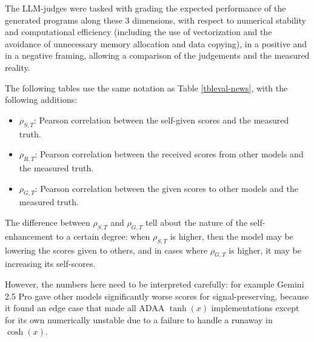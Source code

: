 \documentclass[noindent,nohyp,parspace,titlepage,twoside,12pt]{article}
\begin{document}
    The LLM-judges were tasked with grading the expected performance of the
    generated programs along these 3 dimensions, with respect to numerical
    stability and computational efficiency (including the use of vectorization
    and the avoidance of unnecessary memory allocation and data copying), in
    a positive and in a negative framing, allowing a comparison of the
    judgements and the measured reality.

    The following tables use the same notation as Table \ref{tbleval-news},
    with the following additions:

    \begin{itemize}
      \item $\rho_{S, T}$: Pearson correlation between the self-given scores
            and the measured truth.

      \item $\rho_{R, T}$: Pearson correlation between the received scores
            from other models and the measured truth.

      \item $\rho_{G, T}$: Pearson correlation between the given scores to
            other models and the measured truth.
    \end{itemize}

    The difference between $\rho_{S, T}$ and $\rho_{G, T}$ tell about the
    nature of the self-enhancement to a certain degree: when $\rho_{S, T}$ is
    higher, then the model may be lowering the scores given to others, and in
    cases where $\rho_{G, T}$ is higher, it may be increasing its self-scores.

    However, the numbers here need to be interpreted carefully: for
    example Gemini 2.5 Pro gave other models significantly worse scores for
    signal-preserving, because it found an edge case that made all ADAA
    $\tanh(x)$ implementations except for its own numerically unstable due
    to a failure to handle a runaway in $\cosh(x)$.
\end{document}
